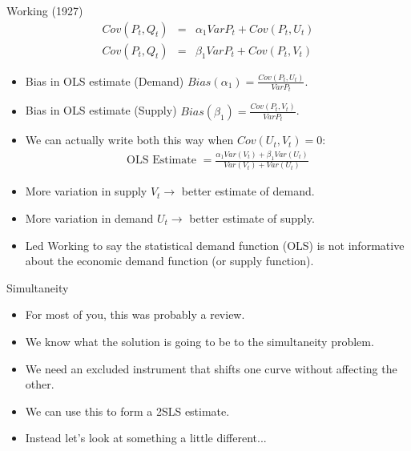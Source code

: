 \begin{frame}{Working (1927)}
\small
\vspace{-0.2cm}
\begin{eqnarray*}
Cov(P_t, Q_t) &=& \alpha_1 Var P_t + Cov (P_t,U_t)\\
Cov(P_t, Q_t) &=& \beta_1 Var P_t + Cov (P_t,V_t)
\end{eqnarray*}
\vspace{-1cm}
\begin{itemize}
\item Bias in OLS estimate (Demand) $Bias(\alpha_1) = \frac{Cov(P_t,U_t)}{Var P_t}$.
\item Bias in OLS estimate (Supply) $Bias(\beta_1) = \frac{Cov(P_t,V_t)}{Var P_t}$.
\item We can actually write both this way when $Cov(U_t,V_t) = 0$:
\begin{eqnarray*}
\text{OLS Estimate }= \frac{\alpha_1 Var(V_t) + \beta_1 Var (U_t)}{Var (V_t) + Var (U_t)}
\end{eqnarray*}
\item More variation in supply $V_t \rightarrow$ better estimate of demand.
\item More variation in demand $U_t \rightarrow$ better estimate of supply.
\item Led Working to say the \alert{statistical demand function} (OLS) is not informative about the economic demand function (or supply function).
\end{itemize}
\end{frame}

\begin{frame}{Simultaneity}
\begin{itemize}
\item For most of you, this was probably a review.
\item We know what the solution is going to be to the simultaneity problem.
\item We need an \alert{excluded instrument} that shifts one curve without affecting the other.
\item We can use this to form a 2SLS estimate.
\item Instead let's look at something a little different...
\end{itemize}
\end{frame}



